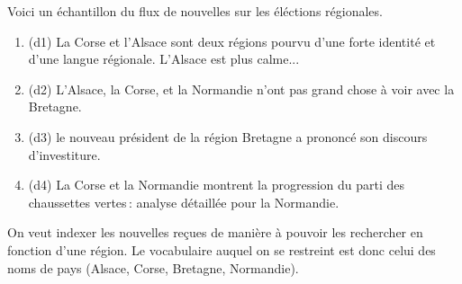 \documentclass[11pt,a4paper]{article}
\begin{document}
Voici un échantillon du flux de nouvelles sur les éléctions régionales. 

\begin{enumerate}
 \item (d1) La Corse et l'Alsace sont deux régions pourvu d'une forte identité
     et d'une langue régionale. L'Alsace est plus calme...
        \item (d2) L'Alsace, la Corse, et la Normandie n'ont pas grand chose à voir avec la Bretagne.
        \item (d3) le nouveau président de la région Bretagne
                a prononcé son discours d'investiture.
           \item (d4) La Corse et la Normandie montrent la progression du parti 
                 des chaussettes vertes\,: analyse détaillée pour la Normandie.
\end{enumerate}

On veut indexer les nouvelles reçues de manière à pouvoir les rechercher
en fonction d'une région. Le vocabulaire auquel on se restreint est donc celui
des noms de pays (Alsace, Corse, Bretagne, Normandie).

\smallskip
\end{document}
